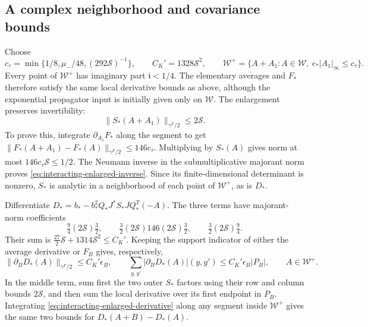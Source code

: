 \documentclass[11pt,letterpaper,reqno]{amsart}
\begin{document}
\subsection{A complex neighborhood and covariance bounds}

Choose
\[
 c_\tau=\min\{1/8,\mu_-/48,(292\mathcal S)^{-1}\},\qquad
 C_K'=1328\mathcal S^2,\qquad
 \mathcal W^+=\{A+A_1:A\in\mathcal W,\ e_*|A_1|_\infty\le c_\tau\}.
\]
Every point of $\mathcal W^+$ has imaginary part
$\mathfrak i<1/4$. The elementary averages and
$F_*$ therefore satisfy the same local derivative
bounds as above, although the exponential propagator
input is initially given only on $\mathcal W$.
The enlargement preserves invertibility:
\begin{equation}\label{eq:interacting-enlarged-inverse}
 \|S_*(A+A_1)\|_{\gamma^F/2}\le2\mathcal S.
\end{equation}
To prove this, integrate $\partial_{A_1}F_*$
along the segment to get
$\|F_*(A+A_1)-F_*(A)\|_{\gamma^F/2}
\le146c_\tau$. Multiplying by $S_*(A)$ gives
norm at most $146c_\tau\mathcal S\le1/2$.
The Neumann inverse in the submultiplicative
majorant norm proves \eqref{eq:interacting-enlarged-inverse}.
Since its finite-dimensional determinant is
nonzero, $S_*$ is analytic in a neighborhood
of each point of $\mathcal W^+$, as is $D_*$.

Differentiate
$D_*=b_*-b_*^2Q_*J^*S_*JQ_*^T(-A)$.
The three terms have majorant-norm coefficients
\[
 \tfrac94(2\mathcal S)\tfrac32,\qquad
 \tfrac32(2\mathcal S)146(2\mathcal S)\tfrac32,\qquad
 \tfrac32(2\mathcal S)\tfrac94.
\]
Their sum is
$\frac{27}{2}\mathcal S+1314\mathcal S^2\le C_K'$.
Keeping the support indicator of either the
average derivative or $F_B$ gives, respectively,
\begin{equation}\label{eq:interacting-enlarged-derivative}
 \|\partial_BD_*(A)\|_{\gamma^F/2}\le C_K'\epsilon_B,\qquad
 \sum_{y,y'}|\partial_BD_*(A)|(y,y')
                                  \le C_K'\epsilon_B|P_B|,
                                      \qquad A\in\mathcal W^+.
\end{equation}
In the middle term, sum first the two outer
$S_*$ factors using their row and column bounds
$2\mathcal S$, and then sum the local derivative
over its first endpoint in $P_B$. Integrating
\eqref{eq:interacting-enlarged-derivative} along
any segment inside $\mathcal W^+$ gives the
same two bounds for $D_*(A+B)-D_*(A)$.
\end{document}
